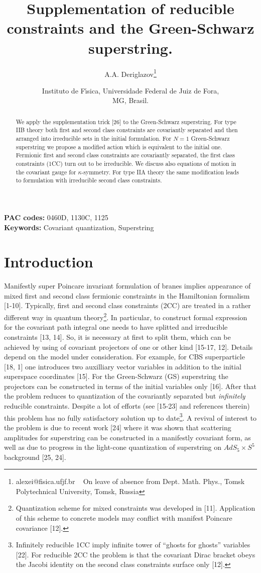 \documentclass[a4paper]{article}
\title{Supplementation of reducible constraints 
and the Green-Schwarz superstring.}
\author{A.A. Deriglazov\thanks{alexei@fisica.ufjf.br ~ On leave of
absence from Dept. Math. Phys., Tomsk Polytechnical University,
Tomsk, Russia}}
\date{Instituto de F\'\i sica, Universidade Federal de Juiz de Fora,\\
MG, Brasil.}
\begin{document}
\maketitle
\large
\begin{abstract}
We apply the supplementation trick [26] to the Green-Schwarz superstring. 
For type IIB theory both first and second class
constraints are covariantly separated and then arranged into irreducible 
sets in the initial formulation.
For $N=1$ Green-Schwarz superstring we propose a modified action 
which is equivalent to the initial one.    
Fermionic first and second class constraints are covariantly 
separated, the first class constraints (1CC) turn out to be irreducible. 
We discuss also equations of motion in the covariant gauge for 
$\kappa$-symmetry.  
For type IIA theory the same modification leads to formulation with 
irreducible second class constraints.
\end{abstract}

{\bf PAC codes:} 0460D, 1130C, 1125 \\
{\bf Keywords:} Covariant quantization, Superstring \\

\noindent
\section{Introduction}
Manifestly super Poincare invariant formulation of branes implies 
appearance of mixed first and second class fermionic constraints 
in the Hamiltonian formalism [1-10]. Typically, 
first and second class constraints (2CC) are treated in a rather 
different way in quantum theory\footnote{Quantization scheme for mixed 
constraints was developed in [11]. Application of this scheme to concrete 
models may conflict with manifest Poincare covariance [12].}. In 
particular, to construct formal expression for the covariant path 
integral one needs to have splitted and irreducible constraints [13, 14]. 
So, it is necessary at first to split them, 
which can be achieved 
by using of covariant projectors of one or other kind [15-17, 12]. 
Details depend on the model under consideration. For example, for 
CBS superparticle [18, 1] one introduces two auxilliary vector 
variables in addition to the initial superspace coordinates [15]. 
For the Green-Schwarz (GS) superstring the projectors can be constructed 
in terms of the initial variables only [16]. After that the problem 
reduces to quantization of the covariantly separated but 
{\em infinitely} reducible constraints. Despite a lot of efforts 
(see [15-23] and references therein) this problem has no fully 
satisfactory solution up to date\footnote{Infinitely reducible 1CC 
imply infinite tower of ``ghosts for ghosts'' variables [22]. For 
reducible 2CC the problem is  
that the covariant Dirac bracket obeys the Jacobi identity 
on the second class constraints surface only [12].}. A revival of interest 
to the problem is due to recent work [24] where it was shown that 
scattering amplitudes for superstring can be constructed in a manifestly 
covariant form, as well as due to progress in the light-cone 
quantization of superstring on $AdS_5\times S^5$ background [25, 24].
\end{document}
